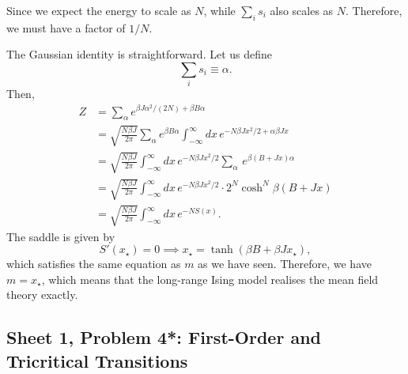 \begin{solution}
    Since we expect the energy to scale as $N$, while $\sum_i s_i$ also scales as $N$. Therefore, we must have a factor of $1/N$.

    The Gaussian identity is straightforward. Let us define
    \begin{equation}
        \sum_i s_i \equiv \alpha.
    \end{equation}
    Then,
    \begin{equation}
        \begin{aligned}
            Z &= \sum_{\alpha} e^{\beta J \alpha^2/(2N)+\beta B \alpha}\\
            &=\sqrt{\frac{N\beta J}{2\pi}}\sum_\alpha e^{\beta B \alpha}\int_{-\infty}^{\infty}dx\,e^{-N\beta Jx^2/2+\alpha\beta Jx}\\
            &=\sqrt{\frac{N\beta J}{2\pi}}\int_{-\infty}^{\infty}dx\,e^{-N\beta Jx^2/2}\sum_\alpha  \,e^{\beta(B +  Jx)\alpha}\\
            &=\sqrt{\frac{N\beta J}{2\pi}}\int_{-\infty}^{\infty}dx\,e^{-N\beta Jx^2/2} \cdot 2^N\cosh^N\beta(B+ Jx) \\
            &=\sqrt{\frac{N\beta J}{2\pi}}
    \int_{-\infty}^{\infty}dx\,e^{-NS(x)}.
        \end{aligned}
    \end{equation}
    The saddle is given by
    \begin{equation}
        S'(x_\star) = 0 \implies x_\star = \tanh (\beta B + \beta J x_\star),
    \end{equation}
    which satisfies the same equation as $m$ as we have seen. Therefore, we have $m = x_\star$, which means that the long-range Ising model realises the mean field theory exactly.
\end{solution}

\subsection{Sheet 1, Problem 4*: First-Order and Tricritical Transitions}

